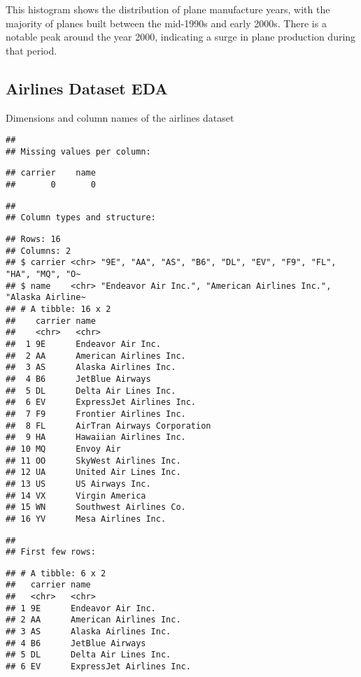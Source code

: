 \documentclass[
]{article}
\begin{document}
This histogram shows the distribution of plane manufacture years, with
the majority of planes built between the mid-1990s and early 2000s.
There is a notable peak around the year 2000, indicating a surge in
plane production during that period.

\subsection{Airlines Dataset EDA}\label{airlines-dataset-eda}

Dimensions and column names of the airlines dataset

\begin{verbatim}
## 
## Missing values per column:
\end{verbatim}

\begin{verbatim}
## carrier    name 
##       0       0
\end{verbatim}

\begin{verbatim}
## 
## Column types and structure:
\end{verbatim}

\begin{verbatim}
## Rows: 16
## Columns: 2
## $ carrier <chr> "9E", "AA", "AS", "B6", "DL", "EV", "F9", "FL", "HA", "MQ", "O~
## $ name    <chr> "Endeavor Air Inc.", "American Airlines Inc.", "Alaska Airline~
## # A tibble: 16 x 2
##    carrier name                       
##    <chr>   <chr>                      
##  1 9E      Endeavor Air Inc.          
##  2 AA      American Airlines Inc.     
##  3 AS      Alaska Airlines Inc.       
##  4 B6      JetBlue Airways            
##  5 DL      Delta Air Lines Inc.       
##  6 EV      ExpressJet Airlines Inc.   
##  7 F9      Frontier Airlines Inc.     
##  8 FL      AirTran Airways Corporation
##  9 HA      Hawaiian Airlines Inc.     
## 10 MQ      Envoy Air                  
## 11 OO      SkyWest Airlines Inc.      
## 12 UA      United Air Lines Inc.      
## 13 US      US Airways Inc.            
## 14 VX      Virgin America             
## 15 WN      Southwest Airlines Co.     
## 16 YV      Mesa Airlines Inc.
\end{verbatim}

\begin{verbatim}
## 
## First few rows:
\end{verbatim}

\begin{verbatim}
## # A tibble: 6 x 2
##   carrier name                    
##   <chr>   <chr>                   
## 1 9E      Endeavor Air Inc.       
## 2 AA      American Airlines Inc.  
## 3 AS      Alaska Airlines Inc.    
## 4 B6      JetBlue Airways         
## 5 DL      Delta Air Lines Inc.    
## 6 EV      ExpressJet Airlines Inc.
\end{verbatim}
\end{document}
